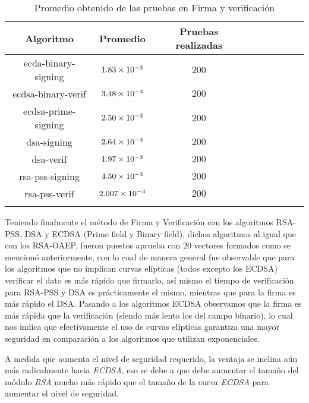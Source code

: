 \documentclass[../main.tex]{subfiles}
\begin{document}
\begin{table}[ht]
  \scriptsize
  \centering
  \caption{Promedio obtenido de las pruebas en Firma y verificación}\label{tab:sig-res}
  \begin{tabular}{|c|c|c|c|c|c|c|c|c|}
    \hline
    \rowcolor[HTML]{000000}
    {\color[HTML]{FFFFFF} Algoritmo} &
  {\color[HTML]{FFFFFF} Promedio} &
  {\color[HTML]{FFFFFF} Pruebas realizadas} \\ \hline
    ecda-binary-signing  & $\num{1.83E-03}$ & $\num{200}$ \\ \hline
    \rowcolor[HTML]{C0C0C0}
    ecdsa-binary-verif & $\num{3.48E-03}$ & $\num{200}$ \\ \hline
    ecdsa-prime-signing & $\num{2.50E-03}$ & $\num{200}$ \\ \hline
    \rowcolor[HTML]{C0C0C0}
    dsa-signing & $\num{2.64E-03}$ & $\num{200}$ \\ \hline
    dsa-verif  & $\num{1.97E-03}$ & $\num{200}$  \\ \hline
    \rowcolor[HTML]{C0C0C0}
    rsa-pss-signing  & $\num{4.50E-03}$ & $\num{200}$ \\ \hline
    rsa-pss-verif  & $\num{2.007E-03}$ & $\num{200}$ \\ \hline
    \rowcolor[HTML]{C0C0C0}

  \end{tabular}
\end{table}

Teniendo finalmente el método de Firma y Verificación con los algoritmos RSA-PSS, DSA y ECDSA (Prime field y Binary field), dichos algoritmos al igual que con los RSA-OAEP, fueron puestos aprueba con 20 vectores formados como se mencionó anteriormente, con lo cual de manera general fue observable que para los algoritmos que no implican curvas elípticas (todos excepto los ECDSA) verificar el dato es más rápido que firmarlo, así mismo el tiempo de verificación para RSA-PSS y DSA es prácticamente el mismo, mientras que para la firma es más rápido el DSA. Pasando a los algoritmos ECDSA observamos que la firma es más rápida que la verificación (siendo más lento los del campo binario), lo cual nos indica que efectivamente el uso de curvas elípticas garantiza una mayor seguridad en comparación a los algoritmos que utilizan exponenciales.

A medida que aumenta el nivel de seguridad requerido, la ventaja se inclina aún más
radicalmente hacia \textit{ECDSA}, eso se debe a que debe aumentar el tamaño del módulo
\textit{RSA} mucho más rápido que el tamaño de la curva \textit{ECDSA} para aumentar el
nivel de seguridad.
\end{document}

